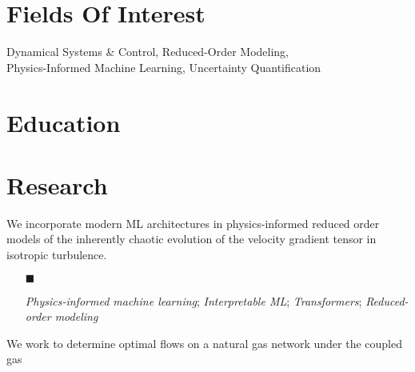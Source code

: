 \documentclass[11pt,a4paper,sans]{moderncv}
\begin{document}
\makecvtitle
\vspace*{-10mm}
\section{Fields Of Interest}
\hspace{1in} \begin{minipage}[c]{0.8\linewidth}
  Dynamical Systems \& Control, Reduced-Order Modeling, \\Physics-Informed Machine Learning, Uncertainty Quantification
\end{minipage}

\section{Education}

\section{Research}

\hspace{1in} \begin{minipage}[c]{0.8\linewidth}
We incorporate modern ML architectures in physics-informed reduced order models of the inherently chaotic evolution of the velocity gradient tensor in isotropic turbulence.

  \begin{itemize}
  \item[{\tiny $\blacksquare$}] \begin{small} \textit{Physics-informed machine learning}; \textit{Interpretable ML}; \textit{Transformers}; \textit{Reduced-order modeling} \end{small}
  \end{itemize}
\end{minipage}



\hspace{1in} We work to determine optimal flows on a natural gas network under the coupled gas
\end{document}
